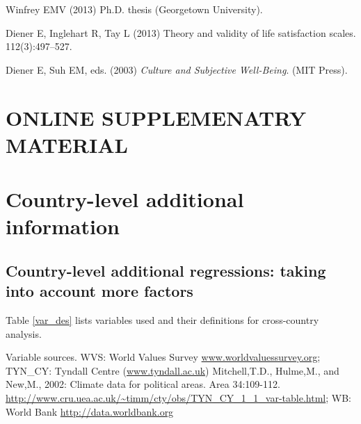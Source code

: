 \documentclass[10pt, letterpaper]{article}
\begin{document}
\begin{spacing}{1.4}
\begin{thebibliography}{10}
Winfrey EMV (2013) Ph.D. thesis (Georgetown University).

Diener E, Inglehart R, Tay L (2013) Theory and validity of life satisfaction
  scales.
 112(3):497--527.

Diener E, Suh EM, eds. (2003) {\em Culture and Subjective Well-Being}.
\newblock (MIT Press).

\end{thebibliography}




\newpage
\section*{\huge ONLINE SUPPLEMENATRY MATERIAL}

\tableofcontents

\section{Country-level additional information}



\subsection{Country-level additional regressions: taking into account more factors}


Table \ref{var_des} lists variables used and their definitions for cross-country
analysis. 




{\scriptsize \noindent Variable sources. WVS: World Values Survey \url{www.worldvaluessurvey.org};
TYN\_CY: Tyndall Centre (\url{www.tyndall.ac.uk}) Mitchell,T.D., Hulme,M., and
New,M., 2002: Climate data for political areas. Area
34:109-112. \url{http://www.cru.uea.ac.uk/~timm/cty/obs/TYN_CY_1_1_var-table.html};
WB: World Bank \url{http://data.worldbank.org}}


\end{spacing}
\end{document}
